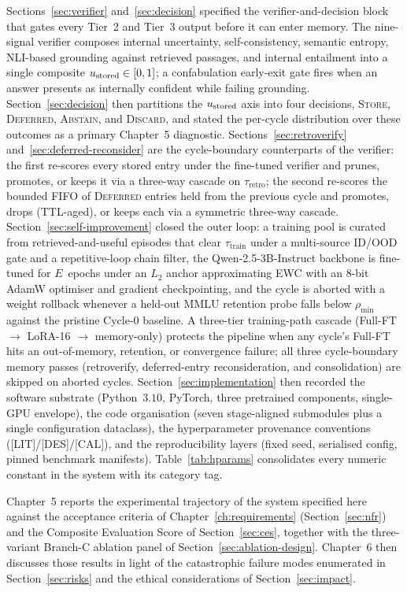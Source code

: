 Sections~\ref{sec:verifier} and~\ref{sec:decision} specified the verifier-and-decision block that gates every Tier~2 and Tier~3 output before it can enter memory. The nine-signal verifier composes internal uncertainty, self-consistency, semantic entropy, NLI-based grounding against retrieved passages, and internal entailment into a single composite $u_{\text{stored}} \in [0, 1]$; a confabulation early-exit gate fires when an answer presents as internally confident while failing grounding. Section~\ref{sec:decision} then partitions the $u_{\text{stored}}$ axis into four decisions, \textsc{Store}, \textsc{Deferred}, \textsc{Abstain}, and \textsc{Discard}, and stated the per-cycle distribution over these outcomes as a primary Chapter~5 diagnostic. Sections~\ref{sec:retroverify} and~\ref{sec:deferred-reconsider} are the cycle-boundary counterparts of the verifier: the first re-scores every stored entry under the fine-tuned verifier and prunes, promotes, or keeps it via a three-way cascade on $\tau_{\text{retro}}$; the second re-scores the bounded FIFO of \textsc{Deferred} entries held from the previous cycle and promotes, drops (TTL-aged), or keeps each via a symmetric three-way cascade. Section~\ref{sec:self-improvement} closed the outer loop: a training pool is curated from retrieved-and-useful episodes that clear $\tau_{\text{train}}$ under a multi-source ID/OOD gate and a repetitive-loop chain filter, the Qwen-2.5-3B-Instruct backbone is fine-tuned for $E$~epochs under an $L_{2}$ anchor approximating EWC with an 8-bit AdamW optimiser and gradient checkpointing, and the cycle is aborted with a weight rollback whenever a held-out MMLU retention probe falls below $\rho_{\min}$ against the pristine Cycle-0 baseline. A three-tier training-path cascade (Full-FT $\to$ LoRA-16 $\to$ memory-only) protects the pipeline when any cycle's Full-FT hits an out-of-memory, retention, or convergence failure; all three cycle-boundary memory passes (retroverify, deferred-entry reconsideration, and consolidation) are skipped on aborted cycles. Section~\ref{sec:implementation} then recorded the software substrate (Python~$3.10$, PyTorch, three pretrained components, single-GPU envelope), the code organisation (seven stage-aligned submodules plus a single configuration dataclass), the hyperparameter provenance conventions ([LIT]/[DES]/[CAL]), and the reproducibility layers (fixed seed, serialised config, pinned benchmark manifests). Table~\ref{tab:hparams} consolidates every numeric constant in the system with its category tag.

Chapter~5 reports the experimental trajectory of the system specified here against the acceptance criteria of Chapter~\ref{ch:requirements} (Section~\ref{sec:nfr}) and the Composite Evaluation Score of Section~\ref{sec:ces}, together with the three-variant Branch-C ablation panel of Section~\ref{sec:ablation-design}. Chapter~6 then discusses those results in light of the catastrophic failure modes enumerated in Section~\ref{sec:risks} and the ethical considerations of Section~\ref{sec:impact}.
